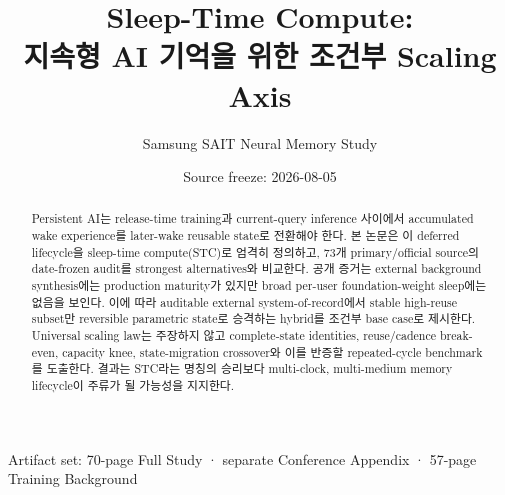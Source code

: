 \documentclass[11pt,a4paper]{article}
\title{\sffamily\bfseries\color{STCNavy}
Sleep-Time Compute:\\
지속형 AI 기억을 위한 조건부 Scaling Axis}
\author{Samsung SAIT Neural Memory Study}
\date{Source freeze: 2026-08-05}
\begin{document}
\maketitle
\begin{abstract}
Persistent AI는 release-time training과 current-query inference 사이에서 accumulated wake experience를
later-wake reusable state로 전환해야 한다. 본 논문은 이 deferred lifecycle을 sleep-time compute(STC)로
엄격히 정의하고, 73개 primary/official source의 date-frozen audit를 strongest alternatives와 비교한다.
공개 증거는 external background synthesis에는 production maturity가 있지만 broad per-user foundation-weight
sleep에는 없음을 보인다. 이에 따라 auditable external system-of-record에서 stable high-reuse subset만
reversible parametric state로 승격하는 hybrid를 조건부 base case로 제시한다. Universal scaling law는
주장하지 않고 complete-state identities, reuse/cadence break-even, capacity knee, state-migration crossover와
이를 반증할 repeated-cycle benchmark를 도출한다. 결과는 STC라는 명칭의 승리보다 multi-clock,
multi-medium memory lifecycle이 주류가 될 가능성을 지지한다.
\end{abstract}

\begin{center}
\small\sffamily
Artifact set: 70-page Full Study · separate Conference Appendix · 57-page Training Background
\end{center}



\printbibliography[heading=bibintoc,title={참고문헌}]
\end{document}
